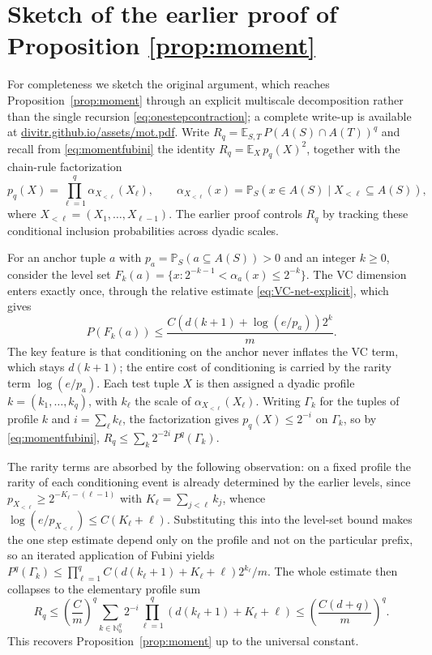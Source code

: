 \documentclass[11pt]{article}
\newcommand{\E}{\mathbb E}
\newcommand{\Prb}{\mathbb P}
\newcommand{\1}{\mathbf 1}
\theoremstyle{plain}
\theoremstyle{remark}
\begin{document}
\section{Sketch of the earlier proof of Proposition \ref{prop:moment}}\label{app:original-pf}

For completeness we sketch the original argument, which reaches Proposition~\ref{prop:moment} through an explicit multiscale decomposition rather than the single recursion \eqref{eq:onestepcontraction}; a complete write-up is available at \href{https://divitr.github.io/assets/mot.pdf}{divitr.github.io/assets/mot.pdf}. Write $R_q=\E_{S,T}\,P(A(S)\cap A(T))^q$ and recall from \eqref{eq:momentfubini} the identity $R_q=\E_X\,p_q(X)^2$, together with the chain-rule factorization
\[
p_q(X)=\prod_{\ell=1}^{q}\alpha_{X_{<\ell}}(X_\ell),
\qquad
\alpha_{X_{<\ell}}(x)=\Prb_S\!\left(x\in A(S)\mid X_{<\ell}\subseteq A(S)\right),
\]
where $X_{<\ell}=(X_1,\dots,X_{\ell-1})$. The earlier proof controls $R_q$ by tracking these conditional inclusion probabilities across dyadic scales.

For an anchor tuple $a$ with $p_a=\Prb_S(a\subseteq A(S))>0$ and an integer $k\ge 0$, consider the level set $F_k(a)=\{x:2^{-k-1}<\alpha_a(x)\le 2^{-k}\}$.
The VC dimension enters exactly once, through the relative estimate \eqref{eq:VC-net-explicit}, which gives
\[
P\!\left(F_k(a)\right)\le\frac{C\left(d(k+1)+\log(e/p_a)\right)2^{k}}{m}.
\]
The key feature is that conditioning on the anchor never inflates the VC term, which stays $d(k+1)$; the entire cost of conditioning is carried by the rarity term $\log(e/p_a)$. Each test tuple $X$ is then assigned a dyadic profile $k=(k_1,\dots,k_q)$, with $k_\ell$ the scale of $\alpha_{X_{<\ell}}(X_\ell)$. Writing $\Gamma_k$ for the tuples of profile $k$ and $i=\sum_\ell k_\ell$, the factorization gives $p_q(X)\le 2^{-i}$ on $\Gamma_k$, so by \eqref{eq:momentfubini}, $R_q\le\sum_k 2^{-2i}\,P^q(\Gamma_k)$.

The rarity terms are absorbed by the following observation: on a fixed profile the rarity of each conditioning event is already determined by the earlier levels, since $p_{X_{<\ell}}\ge 2^{-K_\ell-(\ell-1)}$ with $K_\ell=\sum_{j<\ell}k_j$, whence $\log(e/p_{X_{<\ell}})\le C(K_\ell+\ell)$. Substituting this into the level-set bound makes the one step estimate depend only on the profile and not on the particular prefix, so an iterated application of Fubini yields $P^q(\Gamma_k)\le\prod_{\ell=1}^{q}C\left(d(k_\ell+1)+K_\ell+\ell\right)2^{k_\ell}/m$. The whole estimate then collapses to the elementary profile sum
\[
R_q\le\left(\frac{C}{m}\right)^{q}\sum_{k\in\mathbb N_0^{q}}2^{-i}
\prod_{\ell=1}^{q}\left(d(k_\ell+1)+K_\ell+\ell\right)
\le\left(\frac{C(d+q)}{m}\right)^{q}.
\]
This recovers Proposition~\ref{prop:moment} up to the universal constant.
\end{document}
